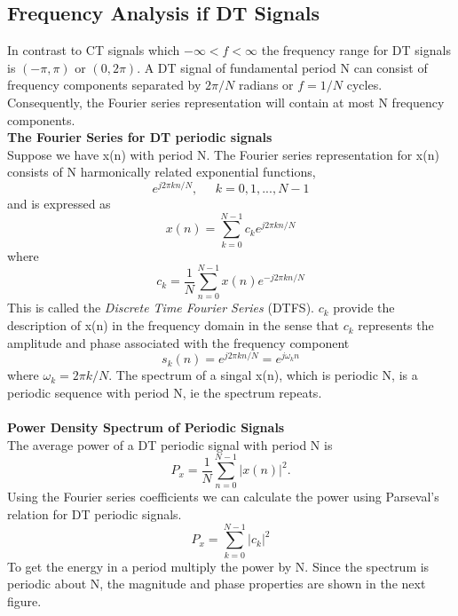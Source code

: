 \documentclass{article} %
\begin{document}
	\subsection{Frequency Analysis if DT Signals}
	In contrast to CT signals which $-\infty < f < \infty$ the frequency range for DT signals is $(-\pi , \pi)$ or $(0, 2\pi)$. A DT signal of
	fundamental period N can consist of frequency components separated by $2\pi /N$ radians or $f = 1/N$ cycles. Consequently,
	the Fourier series representation will contain at most N frequency components. \\
	\textbf{The Fourier Series for DT periodic signals}\\
	Suppose we have x(n) with period N. The Fourier series representation for x(n) consists of N harmonically related exponential functions,
	\begin{equation}
	e^{j2\pi kn/N}, \;\;\;\;\; k = 0,1, ..., N-1
	\end{equation}
	and is expressed as
	\begin{equation}
	x(n) = \sum_{k=0}^{N-1}c_ke^{j2\pi kn/N}
	\end{equation}
	where 
	\begin{equation}
	c_k = \frac{1}{N}\sum_{n=0}^{N-1}x(n)e^{-j2\pi kn/N}
	\end{equation}
	This is called the \textit{Discrete Time Fourier Series} (DTFS). $c_k$ provide the description of x(n) in the frequency domain
	in the sense that $c_k$ represents the amplitude and phase associated with the frequency component
	\begin{equation}
	s_k(n) = e^{j2\pi kn/N} = e^{j\omega_k n}
	\end{equation}
	where $\omega_k = 2\pi k/N$. The spectrum of a singal x(n), which is periodic N, is a periodic sequence with period N, ie the 
	spectrum repeats.
	\\
	\\
	\textbf{Power Density Spectrum of Periodic Signals}\\
	The average power of a DT periodic signal with period N is
	\begin{equation}
	P_x = \frac{1}{N}\sum_{n=0}^{N-1}|x(n)|^2.
	\end{equation}
	Using the Fourier series coefficients we can calculate the power using Parseval's relation for DT periodic signals.
	\begin{equation}
	P_x = \sum_{k=0}^{N-1}|c_k|^2
	\end{equation}
	To get the energy in a period multiply the power by N. Since the spectrum is periodic about N, the magnitude and phase properties are shown
	in the next figure.
\end{document}
